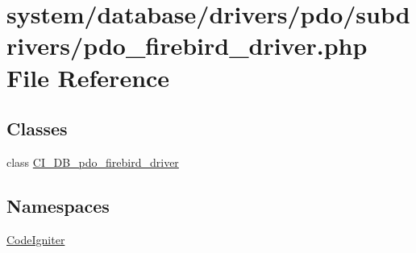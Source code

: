\hypertarget{pdo__firebird__driver_8php}{}\section{system/database/drivers/pdo/subdrivers/pdo\+\_\+firebird\+\_\+driver.php File Reference}
\label{pdo__firebird__driver_8php}
\subsection*{Classes}
\begin{DoxyCompactItemize}
\item 
class \mbox{\hyperlink{class_c_i___d_b__pdo__firebird__driver}{C\+I\+\_\+\+D\+B\+\_\+pdo\+\_\+firebird\+\_\+driver}}
\end{DoxyCompactItemize}
\subsection*{Namespaces}
\begin{DoxyCompactItemize}
\item 
 \mbox{\hyperlink{namespace_code_igniter}{Code\+Igniter}}
\end{DoxyCompactItemize}
